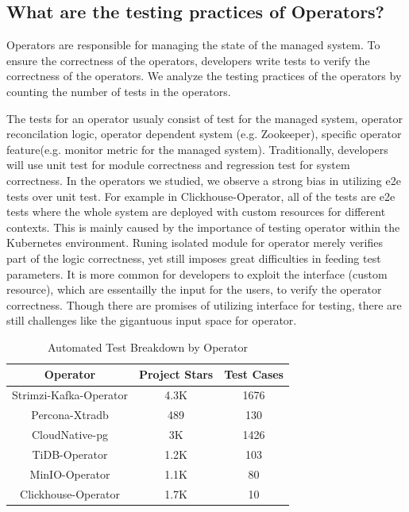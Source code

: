 \subsection{What are the testing practices of Operators?}
Operators are responsible for managing the state of the managed system. To
ensure the correctness of the operators, developers write tests to verify the
correctness of the operators. We analyze the testing practices of the operators
by counting the number of tests in the operators.

The tests for an operator usualy consist of test for the managed system, operator reconcilation logic, 
    operator dependent system (e.g. Zookeeper), specific operator feature(e.g. monitor metric for the managed system).
Traditionally, developers will use unit test for module correctness and regression test for system correctness. 
In the operators we studied, we observe a strong bias in utilizing e2e tests over unit test.
For example in Clickhouse-Operator, all of the tests are e2e tests where the whole system are deployed with 
    custom resources for different contexts.
This is mainly caused by the importance of testing operator within the Kubernetes environment.
Runing isolated module for operator merely verifies part of the logic correctness, yet still imposes great difficulties in 
    feeding test parameters.
It is more common for developers to exploit the interface (custom resource), which are essentailly the input for the users, to verify 
    the operator correctness.
Though there are promises of utilizing interface for testing, there are still challenges like the gigantuous input space for operator.
\begin{table}[h]
    \centering
    \begin{tabular}{|c|c|c|}
        \hline
        \textbf{Operator}      & \textbf{Project Stars} & \textbf{Test Cases} \\
        \hline
        Strimzi-Kafka-Operator & 4.3K                   & 1676                \\
        Percona-Xtradb         & 489                    & 130                 \\
        CloudNative-pg         & 3K                     & 1426                \\
        TiDB-Operator          & 1.2K                   & 103                 \\
        MinIO-Operator         & 1.1K                   & 80                  \\
        Clickhouse-Operator    & 1.7K                   & 10                  \\
        \hline
    \end{tabular}
    \caption{Automated Test Breakdown by Operator}
    \label{tab:testing}
\end{table}
